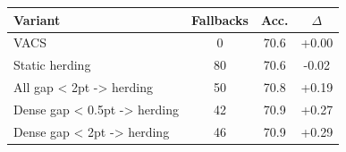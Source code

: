\begin{tabular}{lccc}
\toprule
Variant & Fallbacks & Acc. & $\Delta$ \\
\midrule
VACS & 0 & 70.6 & +0.00 \\
Static herding & 80 & 70.6 & -0.02 \\
All gap < 2pt -> herding & 50 & 70.8 & +0.19 \\
Dense gap < 0.5pt -> herding & 42 & 70.9 & +0.27 \\
Dense gap < 2pt -> herding & 46 & 70.9 & +0.29 \\
\bottomrule
\end{tabular}
